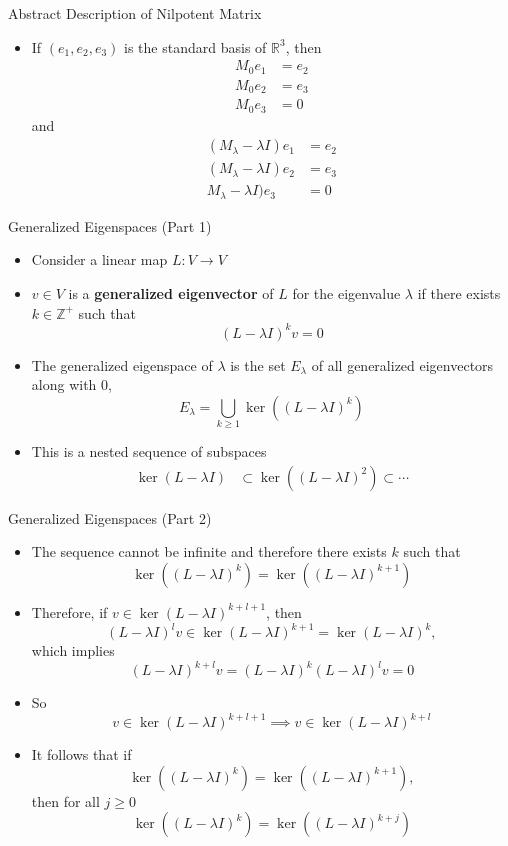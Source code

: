 \documentclass[usenames,dvipsnames,10pt]{beamer}
\newcommand{\Z}{\mathbb{Z}}
\newcommand{\R}{\mathbb{R}}
\begin{document}
\begin{frame}
  {Abstract Description of Nilpotent Matrix}

  \begin{itemize}
  \item If $(e_1,e_2,e_3)$ is the standard basis of $\R^3$, then
    \begin{align*}
      M_0e_1 &= e_2\\
      M_0e_2 &= e_3\\
      M_0e_3 &= 0
    \end{align*}
    and
    \begin{align*}
      (M_\lambda-\lambda I)e_1&= e_2\\
      (M_\lambda-\lambda I) e_2 &= e_3\\
      M_\lambda-\lambda I)e_3 &= 0
    \end{align*}
  \end{itemize}
\end{frame}

\begin{frame}
  {Generalized Eigenspaces (Part 1)}

  \begin{itemize}
  \item Consider a linear map $L: V \rightarrow V$
  \item $v\in V$ is a {\bf generalized eigenvector} of $L$ for the eigenvalue $\lambda$ if there exists $k \in \Z^+$ such that
    \[ (L-\lambda I)^kv = 0 \]
  \item The generalized eigenspace of $\lambda$ is the set $E_\lambda$ of all generalized eigenvectors along with $0$,
    \[ E_\lambda = \bigcup_{k\ge 1} \ker((L-\lambda I)^k) \]
  \item This is a nested sequence of subspaces
    \begin{align*}
      \ker(L-\lambda I) &\subset \ker((L-\lambda I)^2)\subset\cdots
    \end{align*}
  \end{itemize}
\end{frame}

\begin{frame}
  {Generalized Eigenspaces (Part 2)}

  \begin{itemize}
  \item The sequence cannot be infinite and therefore there exists $k$ such that
    \[
      \ker((L-\lambda I)^k) = \ker((L-\lambda I)^{k+1})
    \]
  \item Therefore, if $v \in \ker(L-\lambda I)^{k+l+1}$, then
    \[
      (L-\lambda I)^lv \in \ker (L-\lambda I)^{k+1} = \ker(L-\lambda I)^k,
    \]
    which implies
    \[
      (L-\lambda I)^{k+l}v = (L-\lambda I)^k(L-\lambda I)^lv = 0
    \]
  \item So
    \[ v \in \ker(L-\lambda I)^{k+l+1} \implies v \in \ker(L-\lambda I)^{k+l} \]
  \item It follows that if
    \[
      \ker((L-\lambda I)^k) = \ker((L-\lambda I)^{k+1}),
    \]
    then for all $j \ge 0$
    \[
      \ker((L-\lambda I)^k) = \ker((L-\lambda I)^{k+j})
    \]
  \end{itemize}
\end{frame}
\end{document}
